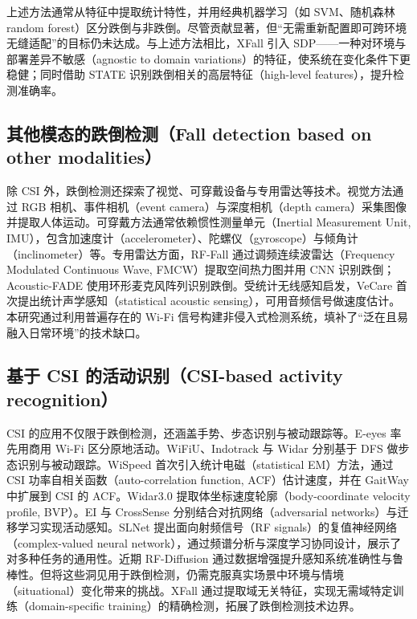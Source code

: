 \documentclass[UTF8,twocolumn]{ctexart}
\begin{document}
上述方法通常从特征中提取统计特性，并用经典机器学习（如 SVM、随机森林 random forest）区分跌倒与非跌倒。尽管贡献显著，但“无需重新配置即可跨环境无缝适配”的目标仍未达成。与上述方法相比，XFall 引入 SDP——一种对环境与部署差异不敏感（agnostic to domain variations）的特征，使系统在变化条件下更稳健；同时借助 STATE 识别跌倒相关的高层特征（high-level features），提升检测准确率。

\subsection{其他模态的跌倒检测（Fall detection based on other modalities）}
除 CSI 外，跌倒检测还探索了视觉、可穿戴设备与专用雷达等技术。视觉方法通过 RGB 相机、事件相机（event camera）与深度相机（depth camera）采集图像并提取人体运动\cite{ref2,ref3,ref4,ref23}。可穿戴方法通常依赖惯性测量单元（Inertial Measurement Unit, IMU），包含加速度计（accelerometer）、陀螺仪（gyroscope）与倾角计（inclinometer）等\cite{ref5,ref6,ref24,ref25,ref26}。专用雷达方面，RF-Fall\cite{ref7} 通过调频连续波雷达（Frequency Modulated Continuous Wave, FMCW）提取空间热力图并用 CNN 识别跌倒；Acoustic-FADE\cite{ref8} 使用环形麦克风阵列识别跌倒。受统计无线感知启发，VeCare\cite{ref27} 首次提出统计声学感知（statistical acoustic sensing），可用音频信号做速度估计。本研究通过利用普遍存在的 Wi\!-\!Fi 信号构建非侵入式检测系统，填补了“泛在且易融入日常环境”的技术缺口。

\subsection{基于 CSI 的活动识别（CSI-based activity recognition）}
CSI 的应用不仅限于跌倒检测，还涵盖手势、步态识别与被动跟踪等。E-eyes\cite{ref9} 率先用商用 Wi\!-\!Fi 区分原地活动。WiFiU\cite{ref28}、Indotrack\cite{ref29} 与 Widar\cite{ref30} 分别基于 DFS 做步态识别与被动跟踪。WiSpeed\cite{ref31} 首次引入统计电磁（statistical EM）方法，通过 CSI 功率自相关函数（auto-correlation function, ACF）估计速度，并在 GaitWay\cite{ref32} 中扩展到 CSI 的 ACF。Widar3.0\cite{ref19} 提取体坐标速度轮廓（body-coordinate velocity profile, BVP）。EI\cite{ref33} 与 CrossSense\cite{ref34} 分别结合对抗网络（adversarial networks）与迁移学习实现活动感知。SLNet\cite{ref35} 提出面向射频信号（RF signals）的复值神经网络（complex-valued neural network），通过频谱分析与深度学习协同设计，展示了对多种任务的通用性。近期 RF-Diffusion\cite{ref13} 通过数据增强提升感知系统准确性与鲁棒性。但将这些洞见用于跌倒检测，仍需克服真实场景中环境与情境（situational）变化带来的挑战。XFall 通过提取域无关特征，实现无需域特定训练（domain-specific training）的精确检测，拓展了跌倒检测技术边界。
\end{document}
